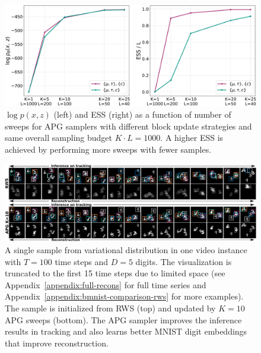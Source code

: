\documentclass{article}
\theoremstyle{definition}
\begin{document}
\begin{figure}[t!]
\centering
\includegraphics[width=\columnwidth]{figures/budget_gmm.pdf}
  \caption{$\log p(x, z)$ (left) and ESS (right) as a function of number of sweeps for APG samplers with different block update strategies and same overall sampling budget $K \cdot L = 1000$. A higher ESS is achieved by performing more sweeps with fewer samples.}
  \label{fig:fixed-budget-gmm}
\end{figure}

\begin{figure}[!t]
  \centering
  \includegraphics[width=1.0\textwidth]{figures/bmnist-5digits-samples-with-rws.pdf}
  \caption{A single sample from variational distribution in one video instance with $T=100$ time steps and $D=5$ digits. The visualization is truncated to the first 15 time steps due to limited space (see Appendix~\ref{appendix:full-recons} for full time series and Appendix~\ref{appendix:bmnist-comparison-rws} for more examples). The sample is initialized from RWS (top) and updated by $K=10$ APG sweeps (bottom). The APG sampler improves the inference results in tracking and also learns better MNIST digit embeddings that improve reconstruction.}
  \label{mnist-qualitative}
\end{figure}
\vspace{-1.0em}
\end{document}
